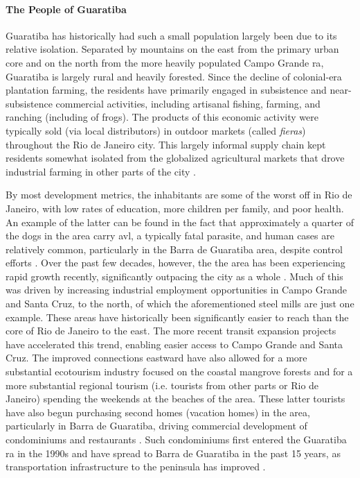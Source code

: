 \paragraph{The People of Guaratiba} \label{sec:guaratiba-people} \leavevmode\newline

Guaratiba has historically had such a small population largely been due to its relative isolation. Separated by mountains on the east from the primary urban core and on the north from the more heavily populated Campo Grande \ac{ra}, Guaratiba is largely rural and heavily forested. Since the decline of colonial-era plantation farming, the residents have primarily engaged in subsistence and near-subsistence commercial activities, including artisanal fishing, farming, and ranching (including of frogs). The products of this economic activity were typically sold (via local distributors) in outdoor markets (called \textit{fieras}) throughout the Rio de Janeiro city. This largely informal supply chain kept residents somewhat isolated from the globalized agricultural markets that drove industrial farming in other parts of the city \cite{fernandesDecodificandoGeografiasPreteritas2010}.

By most development metrics, the inhabitants are some of the worst off in Rio de Janeiro, with low rates of education, more children per family, and poor health. An example of the latter can be found in the fact that approximately a quarter of the dogs in the area carry \ac{avl}, a typically fatal parasite, and human cases are relatively common, particularly in the Barra de Guaratiba area, despite control efforts \cite{cabreraCanineVisceralLeishmaniasis2003}. Over the past few decades, however, the the area has been experiencing rapid growth recently, significantly outpacing the city as a whole \cite{pizzolatoLOCALIZACAOESCOLASPUBLICAS2013}. Much of this was driven by increasing industrial employment opportunities in Campo Grande and Santa Cruz, to the north, of which the aforementioned steel mills are just one example. These areas have historically been significantly easier to reach than the core of Rio de Janeiro to the east. The more recent transit expansion projects have accelerated this trend, enabling easier access to Campo Grande and Santa Cruz. The improved connections eastward have also allowed for a more substantial ecotourism industry focused on the coastal mangrove forests and for a more substantial regional tourism (i.e. tourists from other parts or Rio de Janeiro) spending the weekends at the beaches of the area. These latter tourists have also begun purchasing second homes (vacation homes) in the area, particularly in Barra de Guaratiba, driving commercial development of condominiums and restaurants \cite{herzogGuaratibaVerdeSubsidios2009}. Such condominiums first entered the Guaratiba \ac{ra} in the 1990s and have spread to Barra de Guaratiba in the past 15 years, as transportation infrastructure to the peninsula has improved \cite{fernandesDecodificandoGeografiasPreteritas2010}. 

